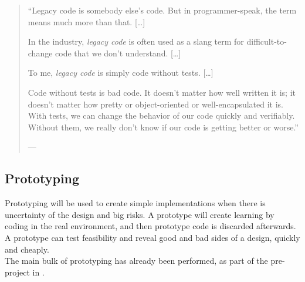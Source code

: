 \begin{quotation}
``Legacy code is somebody else’s code. But in programmer-speak, the term means much more than that. 
[\ldots]


In the industry, \textit{legacy code} is often used as a slang term for difficult-to-change code that we don’t understand. 
[\ldots]


To me, \textit{legacy code} is simply code without tests. [\ldots]


Code without tests is bad code. It doesn’t matter how well written it is; it doesn’t matter how pretty or object-oriented or well-encapsulated it is. With tests, we can change the behavior of our code quickly and verifiably. Without them, we really don’t know if our code is getting better or worse.''


---~\textcite{feathersWorkingEffectivelyLegacy2005}
\end{quotation}


\subsection{Prototyping}

Prototyping will be used to create simple implementations when there is uncertainty of the design and big risks.
A prototype will create learning by coding in the real environment, and then prototype code is discarded afterwards.
A prototype can test feasibility and reveal good and bad sides of a design, quickly and cheaply.\\

The main bulk of prototyping has already been performed, as part of the pre-project in \cite{rekstadModelingEnvironmentCloud2020}.
